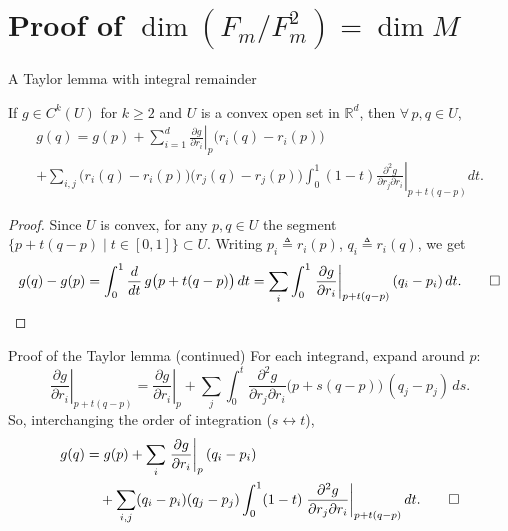 \documentclass[10pt]{beamer}
\newcommand{\R}{\mathbb{R}}
\begin{document}
\section{Proof of $\dim(F_m/F_m^2) = \dim M$}

\begin{frame}{A Taylor lemma with integral remainder}
	\small
	\begin{lemma}
		If $g \in C^k(U)$ for $k \geq 2$ and $U$ is a convex open set in
		$\R^d$, then $\forall\, p, q \in U$,
		\begin{multline*}
			g(q) = g(p) + \sum_{i=1}^{d}
			\left. \frac{\partial g}{\partial r_i} \right|_{p}
			\bigl(r_i(q) - r_i(p)\bigr) \\
			+ \sum_{i,j} \bigl(r_i(q) - r_i(p)\bigr)
			\bigl(r_j(q) - r_j(p)\bigr)
			\int_0^1 (1-t)
			\left. \frac{\partial^2 g}{\partial r_j \partial r_i}
			\right|_{p + t(q - p)} dt .
		\end{multline*}
	\end{lemma}
	\begin{proof}
		Since $U$ is convex, for any $p, q \in U$ the segment
		$\{ p + t(q-p) \mid t \in [0,1] \} \subset U$. Writing
		$p_i \triangleq r_i(p)$, $q_i \triangleq r_i(q)$, we get
		\[
			g(q) - g(p)
			= \int_0^1 \frac{d}{dt}\, g\bigl(p + t(q-p)\bigr)\, dt
			= \sum_i \int_0^1
			\left. \frac{\partial g}{\partial r_i}
			\right|_{p + t(q-p)} (q_i - p_i)\, dt .
			\qedhere
		\]
	\end{proof}
\end{frame}

\begin{frame}{Proof of the Taylor lemma (continued)}
	For each integrand, expand around $p$:
	\[
		\left. \frac{\partial g}{\partial r_i}
		\right|_{p + t(q-p)}
		= \left. \frac{\partial g}{\partial r_i} \right|_{p}
		+ \sum_j \int_0^t
		\frac{\partial^2 g}{\partial r_j \partial r_i}
		\bigl(p + s(q-p)\bigr)\, (q_j - p_j)\, ds .
	\]
	So, interchanging the order of integration ($s \leftrightarrow t$),
	\begin{align*}
		g(q) & = g(p) + \sum_i
		\left. \frac{\partial g}{\partial r_i} \right|_{p} (q_i - p_i) \\
		& \quad + \sum_{i,j} (q_i - p_i)(q_j - p_j) \int_0^1 (1-t)
		\left. \frac{\partial^2 g}{\partial r_j \partial r_i}
		\right|_{p + t(q-p)} dt .
		\qedhere
	\end{align*}
\end{frame}
\end{document}
